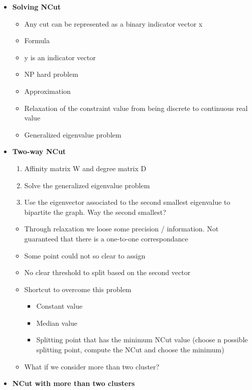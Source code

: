 \begin{itemize}
\begin{itemize}
\begin{itemize}
        \end{itemize}
    \end{itemize}
    \item \textbf{Solving NCut}
    \begin{itemize}
        \item Any cut can be represented as a binary indicator vector x
        \item Formula
        \item y is an indicator vector
        \item NP hard problem
        \item Approximation
        \item Relaxation of the constraint value from being discrete to continuous real value
        \item Generalized eigenvalue problem
    \end{itemize}
    \item \textbf{Two-way NCut}
    \begin{enumerate}
        \item Affinity matrix W and degree matrix D
        \item Solve the generalized eigenvalue problem
        \item Use the eigenvector associated to the second smallest eigenvalue to bipartite the graph. Way the second smallest?
    \end{enumerate}
    \begin{itemize}
        \item Through relaxation we loose some precision / information. Not guaranteed that there is a one-to-one correspondance
        \item Some point could not so clear to assign
        \item No clear threshold to split based on the second vector
        \item Shortcut to overcome this problem
        \begin{itemize}
            \item Constant value
            \item Median value
            \item Splitting point that has the minimum NCut value (choose n possible splitting point, compute the NCut and choose the minimum)
        \end{itemize}
        \item What if we consider more than two cluster?
    \end{itemize}
    \item \textbf{NCut with more than two clusters}

\end{itemize}

